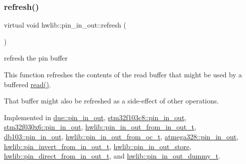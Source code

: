 \subsubsection{\texorpdfstring{refresh()}{refresh()}}
{\footnotesize\ttfamily virtual void hwlib\+::pin\+\_\+in\+\_\+out\+::refresh (\begin{DoxyParamCaption}{ }\end{DoxyParamCaption})\hspace{0.3cm}{\ttfamily [pure virtual]}}

refresh the pin buffer

This function refreshes the contents of the read buffer that might be used by a buffered \hyperlink{classhwlib_1_1pin__in__out_a5caebc7ab9fe49b7e020b89f0a2cf892}{read()}.

That buffer might also be refreshed as a side-\/effect of other operations. 

Implemented in \hyperlink{classdue_1_1pin__in__out_ab9fc7183f352e0b19004779803cd5950}{due\+::pin\+\_\+in\+\_\+out}, \hyperlink{classstm32f103c8_1_1pin__in__out_a58499208b2e6049e7ae88862b029099f}{stm32f103c8\+::pin\+\_\+in\+\_\+out}, \hyperlink{classstm32f030x6_1_1pin__in__out_a5afd4fa1e88219976b7d4d5690edc0b1}{stm32f030x6\+::pin\+\_\+in\+\_\+out}, \hyperlink{classhwlib_1_1pin__in__out__from__in__out__t_a837f2e06d599ef26730a1e05c997d334}{hwlib\+::pin\+\_\+in\+\_\+out\+\_\+from\+\_\+in\+\_\+out\+\_\+t}, \hyperlink{classdb103_1_1pin__in__out_a62907588942315bdfe8d467dadc22ed7}{db103\+::pin\+\_\+in\+\_\+out}, \hyperlink{classhwlib_1_1pin__in__out__from__oc__t_a2662b0d953b8af04f5bb7994cd2787e5}{hwlib\+::pin\+\_\+in\+\_\+out\+\_\+from\+\_\+oc\+\_\+t}, \hyperlink{classatmega328_1_1pin__in__out_ad335cf418492a0631cbd1e0d25e9d0a6}{atmega328\+::pin\+\_\+in\+\_\+out}, \hyperlink{classhwlib_1_1pin__invert__from__in__out__t_a3cb25b54497d924b0b7206af9524d675}{hwlib\+::pin\+\_\+invert\+\_\+from\+\_\+in\+\_\+out\+\_\+t}, \hyperlink{classhwlib_1_1pin__in__out__store_a6b0862f07398e67ec22b7ed2c293c484}{hwlib\+::pin\+\_\+in\+\_\+out\+\_\+store}, \hyperlink{classhwlib_1_1pin__direct__from__in__out__t_aa41926363b1f3f0e64ffdbbca5c9aa2f}{hwlib\+::pin\+\_\+direct\+\_\+from\+\_\+in\+\_\+out\+\_\+t}, and \hyperlink{classhwlib_1_1pin__in__out__dummy__t_a7553d2ee2e380a7156655c725dd71e71}{hwlib\+::pin\+\_\+in\+\_\+out\+\_\+dummy\+\_\+t}.

\mbox{\label{classhwlib_1_1pin__in__out_aa5e2adcb5707f86c20b6306fc09f1582}} 
